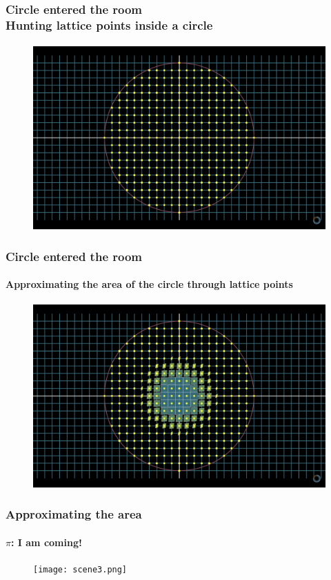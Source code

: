 \documentclass{beamer}
\begin{document}
    \begin{frame}
        \frametitle{Circle entered the room \\ \footnotesize Hunting lattice points inside a circle}
        \framesubtitle{}
        \begin{figure}
            \includegraphics[scale=0.20]{scene1.png}
        \end{figure}
    \end{frame}

    \begin{frame}
        \frametitle{Circle entered the room}
        \framesubtitle{Approximating the area of the circle through lattice points}
        \begin{figure}
            \includegraphics[scale=0.20]{scene2.png}
        \end{figure}
    \end{frame}

    \begin{frame}
        \frametitle{Approximating the area}
        \framesubtitle{\(\pi\): I am coming!}
        \begin{figure}
            \texttt{[image: scene3.png]}
        \end{figure}
    \end{frame}
\end{document}
